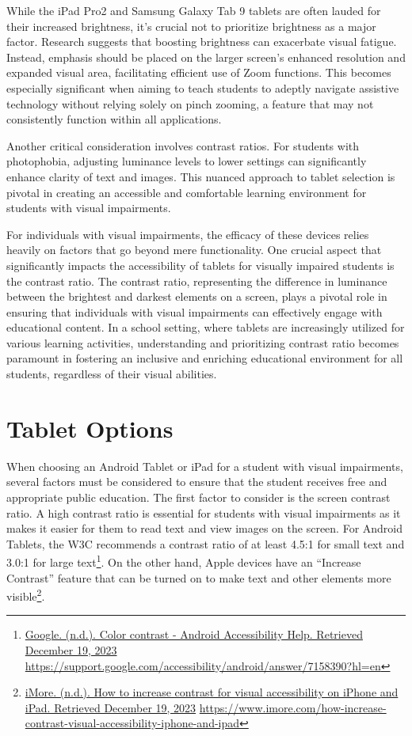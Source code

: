 \documentclass[12pt,letterpaper,twoside]{extreport}
\begin{document}
While the iPad Pro2 and Samsung Galaxy Tab 9 tablets are often lauded for their increased brightness, it's crucial not to prioritize brightness as a major factor. Research suggests that boosting brightness can exacerbate visual fatigue. Instead, emphasis should be placed on the larger screen's enhanced resolution and expanded visual area, facilitating efficient use of Zoom functions. This becomes especially significant when aiming to teach students to adeptly navigate assistive technology without relying solely on pinch zooming, a feature that may not consistently function within all applications.

Another critical consideration involves contrast ratios. For students with photophobia, adjusting luminance levels to lower settings can significantly enhance clarity of text and images. This nuanced approach to tablet selection is pivotal in creating an accessible and comfortable learning environment for students with visual impairments.

For individuals with visual impairments, the efficacy of these devices relies heavily on factors that go beyond mere functionality. One crucial aspect that significantly impacts the accessibility of tablets for visually impaired students is the contrast ratio. The contrast ratio, representing the difference in luminance between the brightest and darkest elements on a screen, plays a pivotal role in ensuring that individuals with visual impairments can effectively engage with educational content. In a school setting, where tablets are increasingly utilized for various learning activities, understanding and prioritizing contrast ratio becomes paramount in fostering an inclusive and enriching educational environment for all students, regardless of their visual abilities.


\pagebreak	\hypertarget{tablet-options}{}\section{Tablet Options}\label{tab:tablelet-options}
When choosing an Android Tablet or iPad for a student with visual impairments, several factors must be considered to ensure that the student receives free and appropriate public education. The first factor to consider is the screen contrast ratio. A high contrast ratio is essential for students with visual impairments as it makes it easier for them to read text and view images on the screen. For Android Tablets, the W3C recommends a contrast ratio of at least 4.5:1 for small text and 3.0:1 for large text\footnote{\raggedright \href{https://support.google.com/accessibility/android/answer/7158390?hl=en}{Google. (n.d.). Color contrast - Android Accessibility Help. Retrieved December 19, 2023} \url{https://support.google.com/accessibility/android/answer/7158390?hl=en}}. On the other hand, Apple devices have an “Increase Contrast” feature that can be turned on to make text and other elements more visible\footnote{\raggedright \href{https://www.imore.com/how-increase-contrast-visual-accessibility-iphone-and-ipad}{iMore. (n.d.). How to increase contrast for visual accessibility on iPhone and iPad. Retrieved December 19, 2023} \url{https://www.imore.com/how-increase-contrast-visual-accessibility-iphone-and-ipad}}.
\end{document}
